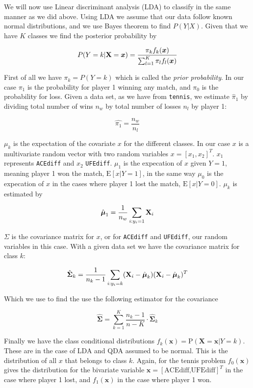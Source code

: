 \documentclass[
]{article}
\begin{document}
We will now use Linear discriminant analysis (LDA) to classify in the
same manner as we did above. Using LDA we assume that our data follow
known normal distributions, and we use Bayes theorem to find \(P(Y|X)\).
Given that we have \(K\) classes we find the posterior probability by

\[
P(Y=k | {\bf X}={\boldsymbol x}) = \frac{\pi_k f_k({\boldsymbol x})}{\sum_{l=1}^K \pi_l f_l({\boldsymbol x})}
\]

First of all we have \(\pi_k = P(Y = k)\) which is called the
\emph{prior probability}. In our case \(\pi_1\) is the probability for
player 1 winning any match, and \(\pi_0\) is the probability for loss.
Given a data set, as we have from \texttt{tennis}, we estimate
\(\hat\pi_1\) by dividing total number of wins \(n_w\) by total number
of losses \(n_l\) by player 1:

\[
\hat{\pi_1} = \dfrac{n_w}{n_l}
\]

\(\mu_k\) is the expectation of the covariate \(x\) for the different
classes. In our case \(x\) is a multivariate random vector with two
random variables \(x = [x_1,x_2]^T\). \(x_1\) represents
\texttt{ACEdiff} and \(x_2\) \texttt{UFEdiff}. \(\mu_1\) is the
expecation of \(x\) given \(Y = 1\), meaning player 1 won the match,
\(\text{E}[x|Y = 1]\), in the same way \(\mu_0\) is the expecation of
\(x\) in the cases where player 1 lost the match, \(\text{E}[x|Y = 0]\).
\(\mu_k\) is estimated by

\[
\hat{\boldsymbol{\mu}}_1 = \frac{1}{n_w}\sum_{i:y_i=1} {\bf X}_i
\]

\(\Sigma\) is the covariance matrix for \(x\), or for \texttt{ACEdiff}
and \texttt{UFEdiff}, our random variables in this case. With a given
data set we have the covariance matrix for class \(k\):

\[
\hat{\boldsymbol{\Sigma}}_k=\frac{1}{n_k-1}\sum_{i:y_i=k} ({\bf X}_i-\hat{\boldsymbol{\mu}}_k ) ({\bf X}_i-\hat{\boldsymbol{\mu}}_k)^T
\]

Which we use to find the use the following estimator for the covariance

\[
\hat{\boldsymbol{\Sigma}}= \sum_{k=1}^K \frac{n_k - 1}{n - K} \cdot \hat{\boldsymbol{\Sigma}}_k
\]

Finally we have the class conditional distributions
\(f_k(\boldsymbol x) =\text{P}(\boldsymbol X =\boldsymbol x|Y = k)\).
These are in the case of LDA and QDA assumed to be normal. This is the
distribution of all \(x\) that belongs to class \(k\). Again, for the
tennis problem \(f_0(\boldsymbol x)\) gives the distribution for the
bivariate variable \(\boldsymbol x = [\text{ACEdiff,UFEdiff}]^T\) in the
case where player 1 lost, and \(f_1(\boldsymbol x)\) in the case where
player 1 won.
\end{document}
